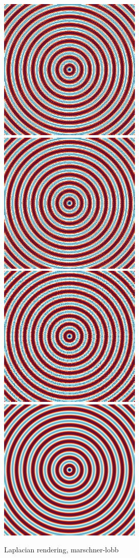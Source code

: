 \begin{figure}
	\centering
	{\includegraphics[width=0.48\linewidth]{img/laplacian/laplacian_00.png}}
	{\includegraphics[width=0.48\linewidth]{img/laplacian/laplacian_11.png}}
	{\includegraphics[width=0.48\linewidth]{img/laplacian/laplacian_22.png}}
	{\includegraphics[width=0.48\linewidth]{img/laplacian/groundtruth_laplacian_00.png}}
	\caption{Laplacian rendering, marschner-lobb}
	\label{fig:laplacian-precision-comparison}
\end{figure}

